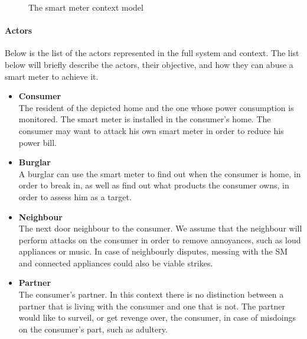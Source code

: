 \begin{figure}[h]
  \centering
  
  \caption{The smart meter context model}
  \label{contextual:sm_model}
\end{figure}

\paragraph{Actors}\label{contextActors}
Below is the list of the actors represented in the full system and context.
The list below will briefly describe the actors, their objective, and how they can abuse a smart meter to achieve it.
\begin{itemize}
\item \textbf{Consumer}\\
The resident of the depicted home and the one whose power consumption is monitored.
The smart meter is installed in the consumer's home.
The consumer may want to attack his own smart meter in order to reduce his power bill.
\item \textbf{Burglar}\\ A burglar can use the smart meter to find out when the consumer is home, in order to break in, as well as find out what products the consumer owns, in order to assess him as a target.
\item \textbf{Neighbour}\\
The next door neighbour to the consumer.
We assume that the neighbour will perform attacks on the consumer in order to remove annoyances, such as loud appliances or music.
In case of neighbourly disputes, messing with the SM and connected appliances could also be viable strikes.
\item \textbf{Partner}\\
The consumer's partner.
In this context there is no distinction between a partner that is living with the consumer and one that is not.
The partner would like to surveil, or get revenge over, the consumer, in case of misdoings on the consumer's part, such as adultery.


\end{itemize}
